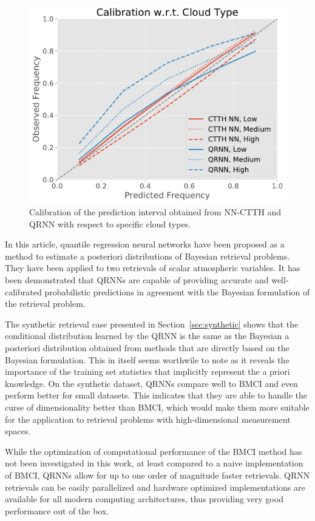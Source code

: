 \documentclass[journal abbreviation, manuscript]{copernicus}
\begin{document}
  \begin{figure}[hbpt!]
    \centering
    \includegraphics[width = 0.5\linewidth]{../plots/calibration_cloud_type}
    \caption{Calibration of the prediction interval obtained from NN-CTTH and QRNN
    with respect to specific cloud types.}
    \label{fig:calibration_cloud_type}
  \end{figure}


\conclusions  %
\label{sec:conclusions}

In this article, quantile regression neural networks have been proposed as a
method to estimate a posteriori distributions of Bayesian retrieval problems.
They have been applied to two retrievals of scalar atmospheric variables. It has
been demonstrated that QRNNs are capable of providing accurate and
well-calibrated probabilistic predictions in agreement with the Bayesian formulation
of the retrieval problem.

The synthetic retrieval case presented in Section~\ref{sec:synthetic} shows that
the conditional distribution learned by the QRNN is the same as the Bayesian a
posteriori distribution obtained from methods that are directly based on the
Bayesian formulation. This in itself seems worthwile to note as it reveals the
importance of the training set statistics that implicitly represent the a priori
knowledge. On the synthetic dataset, QRNNs compare well to BMCI and even perform
better for small datasets. This indicates that they are able to handle the
curse of dimensionality better than BMCI, which would make them more suitable
for the application to retrieval problems with high-dimensional measurement
spaces.

While the optimization of computational performance of the BMCI method has not been
investigated in this work, at least compared to a naive implementation of BMCI,
QRNNs allow for up to one order of magnitude faster retrievals. QRNN retrievals
can be easily parallelized and hardware optimized implementations are available
for all modern computing architectures, thus providing very good performance out
of the box.
\end{document}
